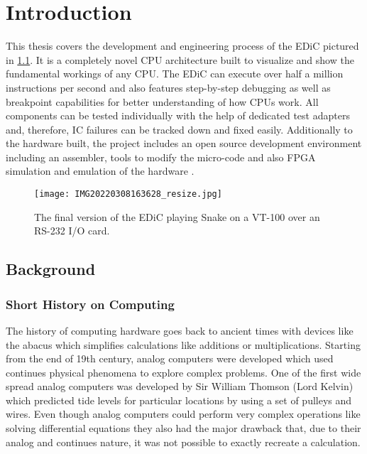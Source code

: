 \chapter{Introduction} \label{cha:intro}
This thesis covers the development and engineering process of the \gls{EDiC} pictured in \cref{fig:EDiCSnake}.
It is a completely novel \gls{CPU} architecture built to visualize and show the fundamental workings of any \gls{CPU}.
The \gls{EDiC} can execute over half a million instructions per second and also features step-by-step debugging as well as breakpoint capabilities for better understanding of how \glspl{CPU} work.
All components can be tested individually with the help of dedicated test adapters and, therefore, \gls{IC} failures can be tracked down and fixed easily.
Additionally to the hardware built, the project includes an open source development environment including an assembler, tools to modify the micro-code and also \gls{FPGA} simulation and emulation of the hardware \cite{EDiCGitHub}.
\begin{figure}[t]
  \centering
  \texttt{[image: IMG20220308163628\_resize.jpg]}
  \caption{The final version of the \gls{EDiC} playing Snake on a VT-100 over an RS-232 I/O card.}
  \label{fig:EDiCSnake}
\end{figure}
\section{Background}
\subsection{Short History on Computing}
The history of computing hardware goes back to ancient times with devices like the abacus which simplifies calculations like additions or multiplications.
Starting from the end of 19th century, analog computers were developed which used continues physical phenomena to explore complex problems.
One of the first wide spread analog computers was developed by Sir William Thomson (Lord Kelvin) which predicted tide levels for particular locations by using a set of pulleys and wires. \cite{sep-computing-history}
Even though analog computers could perform very complex operations like solving differential equations \cite{analogDiff} they also had the major drawback that, due to their analog and continues nature, it was not possible to exactly recreate a calculation.

